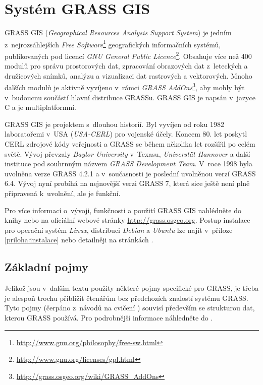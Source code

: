 \documentclass[a4paper,12pt,draft]{article}
\begin{document}
\section{Systém GRASS GIS}
\label{sec:grass}
GRASS GIS (\emph{Geographical Resources Analysis Support
System}) je jedním z~nejrozsáhlejších \emph{Free
Software}\footnote{\url{http://www.gnu.org/philosophy/free-sw.html}}
geografických informačních systémů,
publikovaných pod licencí \emph{GNU General Public
Licence}\footnote{\url{http://www.gnu.org/licenses/gpl.html}}. Obsahuje více
než 400 modulů pro správu prostorových dat, zpracování obrazových dat
z~leteckých a družicových snímků, analýzu a vizualizaci dat rastrových
a vektorových. Mnoho dalších modulů je aktivně vyvíjeno v~rámci \emph{GRASS
AddOns}\footnote{\url{http://grass.osgeo.org/wiki/GRASS_AddOns}}, aby mohly být
v~budoucnu součástí hlavní distribuce GRASSu. GRASS GIS je napsán v~jazyce C a
je multiplatformní.

GRASS GIS je projektem s~dlouhou historií. Byl vyvíjen od roku
1982 laboratořemi v~USA (\emph{USA-CERL}) pro vojenské účely. Koncem
80. let poskytl CERL zdrojové kódy veřejnosti a GRASS se během několika
let rozšířil po celém světě. Vývoj převzaly \emph{Baylor University}
v~Texasu, \emph{Universtät Hannover} a další instituce pod souhrnným názvem
\emph{GRASS Development Team}. V~roce 1998 byla uvolněna verze GRASS
4.2.1 a v~současnosti je poslední uvolněnou verzí GRASS 6.4. Vývoj
nyní probíhá na nejnovější verzi GRASS 7, která sice ještě není plně
připravená k~uvolnění, ale je funkční.

Pro více informací o~vývoji, funkčnosti a použití GRASS GIS nahlédněte
do knihy \cite{grass_gis} nebo na oficiální webové stránky
\url{http://grass.osgeo.org}.
Postup instalace pro operační systém \emph{Linux}, distribuci \emph{Debian} a
\emph{Ubuntu} lze najít v~příloze \ref{priloha:instalace} nebo detailněji na
stránkách \cite{instalace}.

\subsection{Základní pojmy}
\label{sec:grass:pojmy}
Jelikož jsou v~dalším textu použity některé pojmy specifické pro GRASS,
je třeba je alespoň trochu přiblížit čtenářům bez předchozích
znalostí systému GRASS. Tyto pojmy
(čerpáno z~návodů na cvičení \cite{YZOD}) souvisí především se strukturou dat,
kterou GRASS používá. Pro podrobnější informace náhledněte do \cite{grass_gis}.
\end{document}
